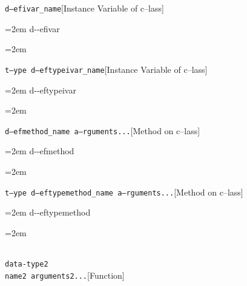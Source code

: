 \documentclass{book}
\begin{document}
\endgroup{}%
\noindent\texttt\bgroup{}d--efivar\_name\egroup{}\hfill[Instance Variable of c--lass]



%
\par\begingroup\obeylines\obeyspaces\frenchspacing\leftskip=2em\relax\parskip=0pt\relax\ttfamily{}%
d{-}{-}efivar
\endgroup{}%
\par\begingroup\obeylines\obeyspaces\frenchspacing\leftskip=2em\relax\parskip=0pt\relax\ttfamily{}%

\endgroup{}%
\noindent\texttt\bgroup{}t--ype d--eftypeivar\_name\egroup{}\hfill[Instance Variable of c--lass]



%
\par\begingroup\obeylines\obeyspaces\frenchspacing\leftskip=2em\relax\parskip=0pt\relax\ttfamily{}%
d{-}{-}eftypeivar
\endgroup{}%
\par\begingroup\obeylines\obeyspaces\frenchspacing\leftskip=2em\relax\parskip=0pt\relax\ttfamily{}%

\endgroup{}%
\noindent\texttt\bgroup{}d--efmethod\_name a--rguments...\egroup{}\hfill[Method on c--lass]



%
\par\begingroup\obeylines\obeyspaces\frenchspacing\leftskip=2em\relax\parskip=0pt\relax\ttfamily{}%
d{-}{-}efmethod
\endgroup{}%
\par\begingroup\obeylines\obeyspaces\frenchspacing\leftskip=2em\relax\parskip=0pt\relax\ttfamily{}%

\endgroup{}%
\noindent\texttt\bgroup{}t--ype d--eftypemethod\_name a--rguments...\egroup{}\hfill[Method on c--lass]



%
\par\begingroup\obeylines\obeyspaces\frenchspacing\leftskip=2em\relax\parskip=0pt\relax\ttfamily{}%
d{-}{-}eftypemethod
\endgroup{}%
\par\begingroup\obeylines\obeyspaces\frenchspacing\leftskip=2em\relax\parskip=0pt\relax\ttfamily{}%


\endgroup{}%
\noindent\texttt\bgroup{}\leavevmode{}\\data-type2\leavevmode{}\\name2 arguments2...\egroup{}\hfill[Function]
\end{document}

